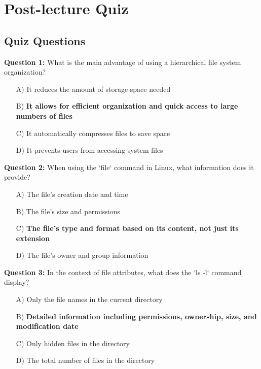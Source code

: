 \section{Post-lecture Quiz}
\label{sec:data-files:post-quiz}

\subsection{Quiz Questions}

\textbf{Question 1:} What is the main advantage of using a hierarchical file system organization?

\begin{enumerate}
    \item[A)] It reduces the amount of storage space needed
    \item[B)] \textbf{It allows for efficient organization and quick access to large numbers of files}
    \item[C)] It automatically compresses files to save space
    \item[D)] It prevents users from accessing system files
\end{enumerate}

\textbf{Question 2:} When using the `file` command in Linux, what information does it provide?

\begin{enumerate}
    \item[A)] The file's creation date and time
    \item[B)] The file's size and permissions
    \item[C)] \textbf{The file's type and format based on its content, not just its extension}
    \item[D)] The file's owner and group information
\end{enumerate}

\textbf{Question 3:} In the context of file attributes, what does the `ls -l` command display?

\begin{enumerate}
    \item[A)] Only the file names in the current directory
    \item[B)] \textbf{Detailed information including permissions, ownership, size, and modification date}
    \item[C)] Only hidden files in the directory
    \item[D)] The total number of files in the directory
\end{enumerate}

